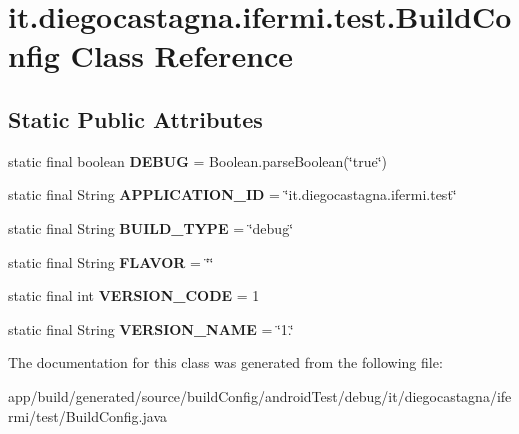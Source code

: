 \hypertarget{classit_1_1diegocastagna_1_1ifermi_1_1test_1_1_build_config}{}\section{it.\+diegocastagna.\+ifermi.\+test.\+Build\+Config Class Reference}
\label{classit_1_1diegocastagna_1_1ifermi_1_1test_1_1_build_config}
\subsection*{Static Public Attributes}
\begin{DoxyCompactItemize}
\item 
\mbox{\label{classit_1_1diegocastagna_1_1ifermi_1_1test_1_1_build_config_a3767dbba2ed0afc9597dca2996a73de2}} 
static final boolean {\bfseries D\+E\+B\+UG} = Boolean.\+parse\+Boolean(\char`\"{}true\char`\"{})
\item 
\mbox{\label{classit_1_1diegocastagna_1_1ifermi_1_1test_1_1_build_config_aceefc9dff37264fdb02bed7a52cf0422}} 
static final String {\bfseries A\+P\+P\+L\+I\+C\+A\+T\+I\+O\+N\+\_\+\+ID} = \char`\"{}it.\+diegocastagna.\+ifermi.\+test\char`\"{}
\item 
\mbox{\label{classit_1_1diegocastagna_1_1ifermi_1_1test_1_1_build_config_a788902b1d7b85920297ed7ce2524c98b}} 
static final String {\bfseries B\+U\+I\+L\+D\+\_\+\+T\+Y\+PE} = \char`\"{}debug\char`\"{}
\item 
\mbox{\label{classit_1_1diegocastagna_1_1ifermi_1_1test_1_1_build_config_a5c54591f0975647f8984f65a79bc292b}} 
static final String {\bfseries F\+L\+A\+V\+OR} = \char`\"{}\char`\"{}
\item 
\mbox{\label{classit_1_1diegocastagna_1_1ifermi_1_1test_1_1_build_config_a99d2773898076e0dad05f068790e9679}} 
static final int {\bfseries V\+E\+R\+S\+I\+O\+N\+\_\+\+C\+O\+DE} = 1
\item 
\mbox{\label{classit_1_1diegocastagna_1_1ifermi_1_1test_1_1_build_config_aa1f5c372888fdd9e7d7e0c1047802bac}} 
static final String {\bfseries V\+E\+R\+S\+I\+O\+N\+\_\+\+N\+A\+ME} = \char`\"{}1.\char`\"{}
\end{DoxyCompactItemize}


The documentation for this class was generated from the following file\+:\begin{DoxyCompactItemize}
\item 
app/build/generated/source/build\+Config/android\+Test/debug/it/diegocastagna/ifermi/test/Build\+Config.\+java\end{DoxyCompactItemize}
